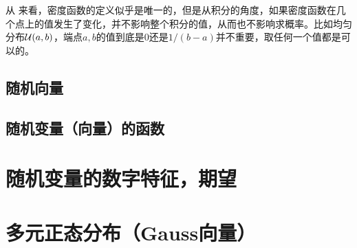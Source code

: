 \begin{remark}
从 来看，密度函数的定义似乎是唯一的，但是从积分的角度，如果密度函数在几个点上的值发生了变化，并不影响整个积分的值，从而也不影响求概率。比如均匀分布$\mathcal{U}(a,b)$，端点$a,b$的值到底是$0$还是$1/(b-a)$并不重要，取任何一个值都是可以的。    
\end{remark}

\subsection{随机向量}

\subsection{随机变量（向量）的函数}

\section{随机变量的数字特征，期望}\label{sec:expectation}

\section{多元正态分布（Gauss向量）}

\endgroup